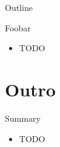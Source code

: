 \begin{frame}{Outline}
  \tableofcontents[current]
\end{frame}

\begin{frame}{Foobar}
  \begin{itemize}
  \item TODO
  \end{itemize}
\end{frame}


\section*{Outro}

\begin{frame}{Summary}
  \begin{itemize}
  \item TODO
  \end{itemize}
\end{frame}

